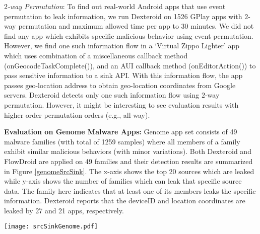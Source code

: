 \documentclass[10pt]{elsarticle}
\begin{document}
{\noindent \emph{$2$-way Permutation}:} To find out real-world Android apps that use event permutation to leak information, we run Dexteroid on 1526 GPlay apps with $2$-way permutation and maximum allowed time per app to 30 minutes. We did not find any app which exhibits specific malicious behavior using event permutation. However, we find one such information flow in a `Virtual Zippo Lighter' app which uses combination of a miscellaneous callback method ({\ttfamily onGeocodeTaskComplete()}), and an AUI callback method ({\ttfamily onEditorAction()}) to pass sensitive information to a sink API. With this information flow, the app passes geo-location address to obtain geo-location coordinates from Google servers. Dexteroid detects only one such information flow using $2$-way permutation. However, it might be interesting to see evaluation results with higher order permutation orders (e.g., all-way). 


{\noindent \bf Evaluation on Genome Malware Apps:} Genome app set \cite{dissectingAndroid} consists of 49 malware families (with total of 1259 samples) where all members of a family exhibit similar malicious behaviors (with minor variations). Both Dexteroid and FlowDroid are applied on 49 families and their detection results are summarized in Figure \ref{genomeSrcSink}. The x-axis shows the top 20 sources which are leaked while y-axis shows the number of families which can leak that specific source data. The family here indicates that at least one of its members leaks the specific information. Dexteroid reports that the deviceID and location coordinates are leaked by 27 and 21 apps, respectively.


\begin{figure*}[ht]
\centering
\texttt{[image: srcSinkGenome.pdf]}
\caption{Information Leakage Detection by Dexteroid and FlowDroid in 49 Genome Families}
\label{genomeSrcSink}
\end{figure*}
\end{document}
